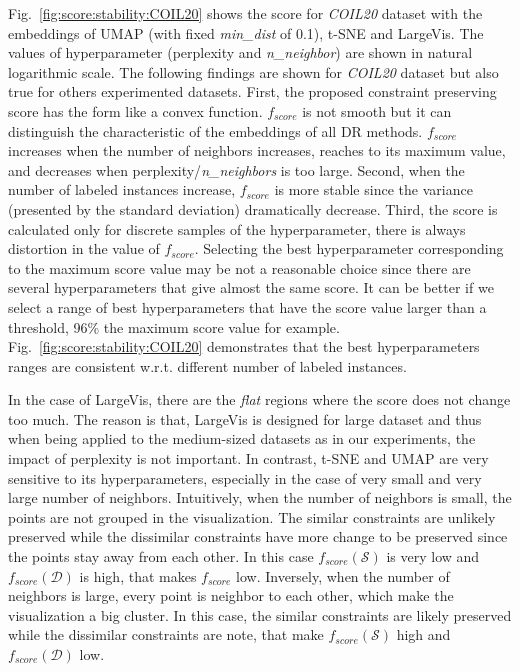 Fig.~\ref{fig:score:stability:COIL20} shows the score for \emph{COIL20} dataset with the embeddings of UMAP (with fixed \emph{min\_dist} of 0.1), t-SNE and LargeVis.
The values of hyperparameter (perplexity and \emph{n\_neighbor}) are shown in natural logarithmic scale.
The following findings are shown for \emph{COIL20} dataset but also true for others experimented datasets.
First, the proposed constraint preserving score has the form like a convex function.
$f_{score}$ is not smooth but it can distinguish the characteristic of the embeddings of all DR methods.
$f_{score}$ increases when the number of neighbors increases, reaches to its maximum value, and decreases when perplexity/\emph{n\_neighbors} is too large.
Second, when the number of labeled instances increase, $f_{score}$ is more stable since the variance (presented by the standard deviation) dramatically decrease.
Third, the score is calculated only for discrete samples of the hyperparameter, there is always distortion in the value of $f_{score}$.
Selecting the best hyperparameter corresponding to the maximum score value may be not a reasonable choice since there are several hyperparameters that give almost the same score.
It can be better if we select a range of best hyperparameters that have the score value larger than a threshold, 96\% the maximum score value for example.
Fig.~\ref{fig:score:stability:COIL20} demonstrates that the best hyperparameters ranges are consistent w.r.t. different number of labeled instances.

In the case of LargeVis, there are the \emph{flat} regions where the score does not change too much.
The reason is that, LargeVis is designed for large dataset and thus when being applied to the medium-sized datasets as in our experiments, the impact of perplexity is not important.
In contrast, t-SNE and UMAP are very sensitive to its hyperparameters, especially in the case of very small and very large number of neighbors.
Intuitively, when the number of neighbors is small, the points are not grouped in the visualization.
The similar constraints are unlikely preserved while the dissimilar constraints have more change to be preserved since the points stay away from each other.
In this case $f_{score}(\mathcal{S})$ is very low and $f_{score}(\mathcal{D})$ is high, that makes $f_{score}$ low.
Inversely, when the number of neighbors is large, every point is neighbor to each other, which make the visualization a big cluster.
In this case, the similar constraints are likely preserved while the dissimilar constraints are note, that make $f_{score}(\mathcal{S})$ high and $f_{score}(\mathcal{D})$ low.

